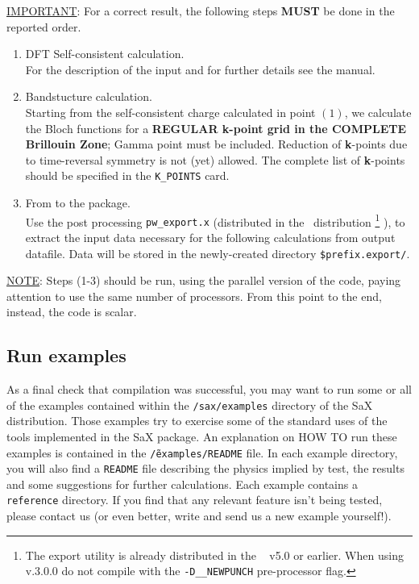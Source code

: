 \documentclass[11pt]{article}
\begin{document}
\noindent \underline{IMPORTANT}: For a correct result, the
following steps \textbf{MUST} be done in the reported order.

\begin{enumerate}
%
\item DFT Self-consistent calculation.\\
      \noindent For the description of the input and for further details see the \PWSCF
      manual.
\item Bandstucture calculation.\\
      \noindent  Starting from the self-consistent charge
      calculated in point $(1)$, we calculate the Bloch functions for a
      {\bf REGULAR {\bf k}-point grid in the COMPLETE Brillouin Zone}; Gamma point
      must be included. Reduction of \textbf{k}-points due to time-reversal
      symmetry is not (yet) allowed. The complete list of
      \textbf{k}-points should be specified in the {\tt K\_POINTS} card.
\item From \PWSCF to the \SAX package.\\
      \noindent Use the post processing
      {\tt pw\_export.x} (distributed in the \ESPRESSO~distribution
      \footnote{The export utility is already distributed in the
      \ESPRESSO~ v5.0 or earlier.
      When using v.3.0.0 do not compile with
      the {\tt -D\_\_NEWPUNCH} pre-processor flag.}
      ),
      to extract the input data necessary for the following
      calculations
      from \PWSCF output datafile. Data will be stored in the
      newly-created directory {\tt \$prefix.export/}.
\end{enumerate}

\noindent \underline{NOTE}: Steps (1-3) should be run, using the
parallel version of the code, paying attention to use the same
number of processors. From this point to the end, instead, the
code is scalar.

\subsection{Run examples}
  \label{runexamples}

As a final check that compilation was successful, you may want to run
some or all of the examples contained within the \texttt{/sax/examples}
directory of the SaX distribution.
Those examples try to exercise some of the standard uses of the tools implemented in the
SaX package. An explanation on HOW TO run these examples is contained in the \texttt{\~/examples/README} file. In each example directory, you will also find a \texttt{README} file describing the physics implied by test, the results and some suggestions for further calculations. 
Each example contains a \texttt{reference} directory. 
If you find that any relevant feature isn't being tested, please
contact us (or even better, write and send us a new example
yourself!).
\end{document}
